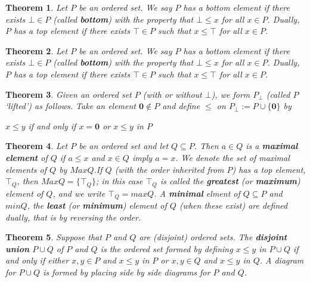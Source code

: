 \documentclass[a4paper,12pt,oneside]{report}%
\newtheorem{theorem}{Theorem}
\begin{document}
\begin{theorem}
Let $P$ be an ordered set. We say $P$ has a bottom element if there exists
    $\bot \in P$ (called \textbf{bottom}) with the property that $\bot \leq x$
    for all $x \in P$.
Dually,  $P$ has a top element if there exists $\top \in P$ such that
    $x \leq \top$ for all $x \in P$.
\end{theorem}

\begin{theorem}
Let $P$ be an ordered set. We say $P$ has a bottom element if there exists
    $\bot \in P$ (called \textbf{bottom}) with the property that $\bot \leq x$
    for all $x \in P$.
Dually,  $P$ has a top element if there exists $\top \in P$ such that
    $x \leq \top$ for all $x \in P$.
\end{theorem}

\begin{theorem}
Given an ordered set $P$ (with or without $\bot$), we form $P_{\bot}$ (called
    $P$ `lifted') as follows. Take an element $\textbf{0} \notin P$ and define
    $\leq$ on $P_{\bot} := P \cup \lbrace\textbf{0}\rbrace$ by
    \begin{center}
        $x \leq y$ if and only if $x = \textbf{0}$ or $x \leq y$ in $P$
    \end{center}
\end{theorem}

\begin{theorem}
Let $P$ be an ordered set and let $Q \subseteq P$. Then $a \in Q$ is a
    \textbf{maximal element} of $Q$ if $a \leq x$ and $x \in Q$ imply $a = x$.
We denote the set of maximal elements of $Q$ by $MaxQ$.If $Q$ (with the order
    inherited from $P$) has a top element, $\top_{Q}$, then 
    $MaxQ = \lbrace \top_{Q} \rbrace$; in this case $\top_{Q}$ is called the
    \textbf{greatest} (or \textbf{maximum}) element of $Q$, and we write
    $\top_{Q} = maxQ$. 
A \textbf{minimal} elment of $Q \subseteq P$ and $minQ$, the \textbf{least} (or 
    \textbf{minimum}) element of $Q$ (when these exist) are defined dually, that 
    is by reversing the order.
\end{theorem}

\begin{theorem}
Suppose that $P$ and $Q$ are (disjoint) ordered sets. The
    \textbf{disjoint union} $P \cup Q$ of $P$ and $Q$ is the ordered set formed
    by defining $x \leq y$ in $P \cup Q$ if and only if either $x,y \in P$ and
    $x \leq y$ in $P$ or $x,y \in Q$ and $x \leq y$ in $Q$.
A diagram for $P \cup Q$ is formed by placing side by side diagrams for $P$ and 
    $Q$.
\end{theorem}
\end{document}
